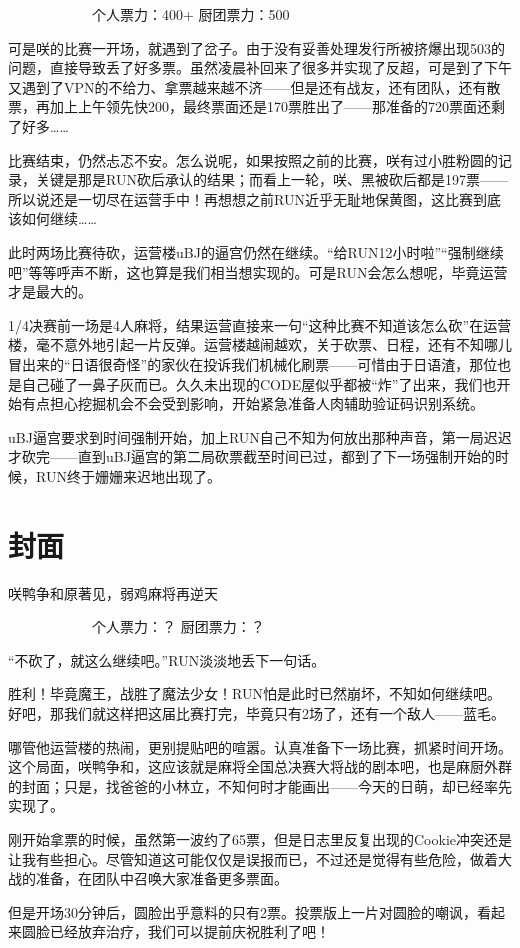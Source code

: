 　　　　　　个人票力：400+ 厨团票力：500

可是咲的比赛一开场，就遇到了岔子。由于没有妥善处理发行所被挤爆出现503的问题，直接导致丢了好多票。虽然凌晨补回来了很多并实现了反超，可是到了下午又遇到了VPN的不给力、拿票越来越不济——但是还有战友，还有团队，还有散票，再加上上午领先快200，最终票面还是170票胜出了——那准备的720票面还剩了好多……

比赛结束，仍然忐忑不安。怎么说呢，如果按照之前的比赛，咲有过小胜粉圆的记录，关键是那是RUN砍后承认的结果；而看上一轮，咲、黑被砍后都是197票——所以说还是一切尽在运营手中！再想想之前RUN近乎无耻地保黄图，这比赛到底该如何继续……

此时两场比赛待砍，运营楼uBJ的逼宫仍然在继续。“给RUN12小时啦”“强制继续吧”等等呼声不断，这也算是我们相当想实现的。可是RUN会怎么想呢，毕竟运营才是最大的。

1/4决赛前一场是4人麻将，结果运营直接来一句“这种比赛不知道该怎么砍”在运营楼，毫不意外地引起一片反弹。运营楼越闹越欢，关于砍票、日程，还有不知哪儿冒出来的“日语很奇怪”的家伙在投诉我们机械化刷票——可惜由于日语渣，那位也是自己碰了一鼻子灰而已。久久未出现的CODE屋似乎都被“炸”了出来，我们也开始有点担心挖掘机会不会受到影响，开始紧急准备人肉辅助验证码识别系统。

uBJ逼宫要求到时间强制开始，加上RUN自己不知为何放出那种声音，第一局迟迟才砍完——直到uBJ逼宫的第二局砍票截至时间已过，都到了下一场强制开始的时候，RUN终于姗姗来迟地出现了。


\section{封面}
咲鸭争和原著见，弱鸡麻将再逆天

　　　　　　个人票力：？ 厨团票力：？

“不砍了，就这么继续吧。”RUN淡淡地丢下一句话。

胜利！毕竟魔王，战胜了魔法少女！RUN怕是此时已然崩坏，不知如何继续吧。好吧，那我们就这样把这届比赛打完，毕竟只有2场了，还有一个敌人——蓝毛。

哪管他运营楼的热闹，更别提贴吧的喧嚣。认真准备下一场比赛，抓紧时间开场。这个局面，咲鸭争和，这应该就是麻将全国总决赛大将战的剧本吧，也是麻厨外群的封面；只是，找爸爸的小林立，不知何时才能画出——今天的日萌，却已经率先实现了。

刚开始拿票的时候，虽然第一波约了65票，但是日志里反复出现的Cookie冲突还是让我有些担心。尽管知道这可能仅仅是误报而已，不过还是觉得有些危险，做着大战的准备，在团队中召唤大家准备更多票面。

但是开场30分钟后，圆脸出乎意料的只有2票。投票版上一片对圆脸的嘲讽，看起来圆脸已经放弃治疗，我们可以提前庆祝胜利了吧！

